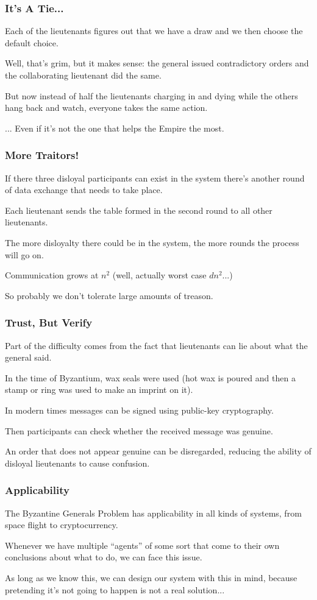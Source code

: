 \begin{frame}
\frametitle{It's A Tie...}

Each of the lieutenants figures out that we have a draw and we then choose the default choice. 

Well, that's grim, but it makes sense: the general issued contradictory orders and the collaborating lieutenant did the same. 

But now instead of half the lieutenants charging in and dying while the others hang back and watch, everyone takes the same action.

... Even if it's not the one that helps the Empire the most.


\end{frame}

\begin{frame}
\frametitle{More Traitors!}

If there three disloyal participants can exist in the system there's another round of data exchange that needs to take place. 

Each lieutenant sends the table formed in the second round to all other lieutenants. 

The more disloyalty there could be in the system, the more rounds the process will go on.

Communication grows at $n^{2}$ (well, actually worst case $dn^{2}$...)

So probably we don't tolerate large amounts of treason.

\end{frame}

\begin{frame}
\frametitle{Trust, But Verify}

Part of the difficulty comes from the fact that lieutenants can lie about what the general said.  

In the time of Byzantium, wax seals were used (hot wax is poured and then a stamp or ring was used to make an imprint on it). 

In modern times messages can be signed using public-key cryptography. 

Then participants can check whether the received message was genuine. 

An order that does not appear genuine can be disregarded, reducing the ability of disloyal lieutenants to cause confusion.

\end{frame}

\begin{frame}
\frametitle{Applicability}

The Byzantine Generals Problem has applicability in all kinds of systems, from space flight to cryptocurrency. 

Whenever we have multiple ``agents'' of some sort that come to their own conclusions about what to do, we can face this issue. 

As long as we know this, we can design our system with this in mind, because pretending it's not going to happen is not a real solution...


\end{frame}





